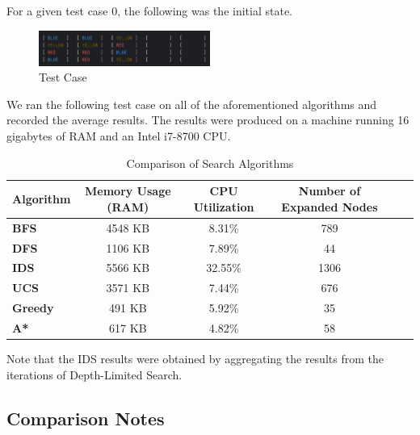 \documentclass{article}
\begin{document}
For a given test case 0, the following was the initial state.
\begin{figure}[ht]
    \centering
    \includegraphics[width=0.5\textwidth]{TestCase1.png}
    \caption{Test Case}
    \label{fig:testcase1}
\end{figure}

We ran the following test case on all of the aforementioned algorithms and recorded the average results. The results were produced on a machine running 16 gigabytes of RAM and an Intel i7-8700 CPU.

\begin{table}[H]
    \centering
    \begin{tabular}{|l|c|c|c|c|c|}
        \hline
        \textbf{Algorithm} & \textbf{Memory Usage (RAM)} & \textbf{CPU Utilization} & \textbf{Number of Expanded Nodes} \\ \hline
        \textbf{BFS} & 4548 KB & 8.31\% & 789 \\ \hline
        \textbf{DFS} & 1106 KB & 7.89\% & 44 \\ \hline
        \textbf{IDS} & 5566 KB & 32.55\% & 1306 \\ \hline
        \textbf{UCS} & 3571 KB & 7.44\% & 676 \\ \hline
        \textbf{Greedy} & 491 KB & 5.92\% & 35 \\ \hline
        \textbf{A*} & 617 KB & 4.82\% & 58 \\ \hline
    \end{tabular}
    \caption{Comparison of Search Algorithms}
\end{table}

Note that the IDS results were obtained by aggregating the results from the iterations of Depth-Limited Search.

\subsection{Comparison Notes}
\end{document}
